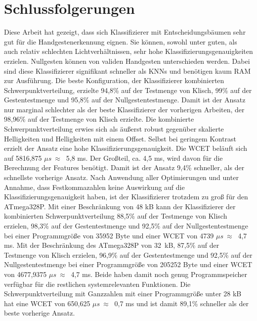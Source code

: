 \chapter{Schlussfolgerungen}
Diese Arbeit hat gezeigt, dass sich Klassifizierer mit Entscheidungsbäumen sehr gut für die Handgestenerkennung eignen. Sie können, sowohl unter guten, als auch
relativ schlechten Lichtverhältnissen, sehr hohe Klassifizierungsgenauigkeiten erzielen. Nullgesten können von validen Handgesten unterschieden werden. Dabei sind diese Klassifizierer signifikant
schneller als KNNs und benötigen kaum RAM zur Ausführung.
\newline
\newline
Die beste Konfiguration, der Klassifizierer kombinierten Schwerpunktverteilung, erzielte 94,8\% auf der Testmenge von Klisch, 99\% auf der Gestentestmenge und 95,8\% auf der Nullgestentestmenge. Damit
ist der Ansatz nur marginal schlechter als der beste Klassifizierer der vorherigen Arbeiten, der 98,96\% auf der Testmenge von Klisch erzielte. Die kombinierte Schwerpunktverteilung erwies sich als
äußerst robust gegenüber skalierte Helligkeiten und Helligkeiten mit einem Offset. Selbst bei geringem Kontrast erzielt der Ansatz eine hohe Klassifizierungsgenauigkeit. Die WCET beläuft
sich auf 5816,875 $\mu s\ \approx\ $ 5,8 ms. Der Großteil, ca. 4,5 ms, wird davon für die Berechnung der Features benötigt. Damit ist der Ansatz 9,4\% schneller, als der schnellste vorherige Ansatz.
Nach Anwendung aller Optimierungen und unter Annahme, dass Festkommazahlen keine Auswirkung auf die Klassifizierungsgenauigkeit haben, ist der Klassifizierer trotzdem zu groß für den ATmega328P.
\newline
\newline
Mit einer Beschränkung von 48 kB kann der Klassifizierer der kombinierten Schwerpunktverteilung 88,5\% auf der Testmenge von Klisch erzielen, 98,3\% auf
der Gestentestmenge und 92,5\% auf der Nullgestentestmenge bei einer Programmgröße von 35952 Byte und einer WCET von 4739 $\mu s\ \approx\ $ 4,7 ms. Mit der Beschränkung des ATmega328P von 32\ kB, 87,5\% auf der
Testmenge von Klisch erzielen, 96,9\% auf der Gestentestmenge und 92,5\% auf der Nullgestentestmenge bei einer Programmgröße von 205252 Byte und einer WCET von 4677,9375 $\mu s\ \approx\ $ 4,7 ms.
Beide haben damit noch genug Programmspeicher verfügbar für die restlichen systemrelevanten Funktionen.
\newline
\newline
Die Schwerpunktverteilung mit Ganzzahlen mit einer Programmgröße unter 28 kB hat eine WCET von 650,625 $\mu s\ \approx\ $ 0,7 ms und ist damit 89,1\% schneller als der beste vorherige Ansatz.
